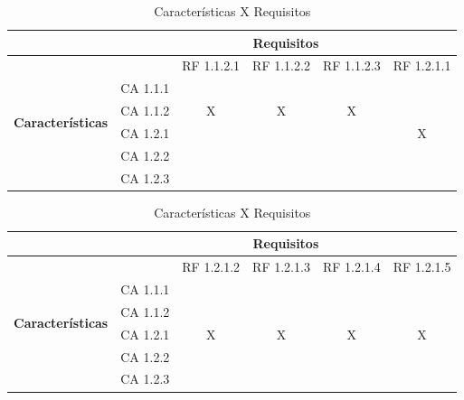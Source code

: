 \begin{table}[!h]
\centering
\caption{Características X Requisitos}
\label{Características_X_Requisitos_3}
\begin{tabular}{|c|c|c|c|c|c|}
\hline
  & \multicolumn{5}{c|}{\textbf{Requisitos}}                    \\ \hline
    \multirow{6}{*}{\textbf{Características}} &   & RF 1.1.2.1 & RF 1.1.2.2 & RF 1.1.2.3 & RF 1.2.1.1 \\ \cline{2-6}
                                       & CA 1.1.1 &            &            &            &           \\ \cline{2-6}
                                       & CA 1.1.2 & X          & X          & X          &           \\ \cline{2-6}
                                       & CA 1.2.1 &            &            &            &  X        \\ \cline{2-6}
                                       & CA 1.2.2 &            &            &            &           \\ \cline{2-6}
                                       & CA 1.2.3 &            &            &            &           \\ \hline
\end{tabular}
\end{table}


\begin{table}[!h]
\centering
\caption{Características X Requisitos}
\label{Características_X_Requisitos_4}
\begin{tabular}{|c|c|c|c|c|c|}
\hline
  & \multicolumn{5}{c|}{\textbf{Requisitos}}                    \\ \hline
    \multirow{6}{*}{\textbf{Características}} &   & RF 1.2.1.2 & RF 1.2.1.3 & RF 1.2.1.4 & RF 1.2.1.5 \\ \cline{2-6}
                                       & CA 1.1.1 &            &            &            &           \\ \cline{2-6}
                                       & CA 1.1.2 &            &            &            &           \\ \cline{2-6}
                                       & CA 1.2.1 & X          & X          & X          &  X        \\ \cline{2-6}
                                       & CA 1.2.2 &            &            &            &           \\ \cline{2-6}
                                       & CA 1.2.3 &            &            &            &           \\ \hline
\end{tabular}
\end{table}


